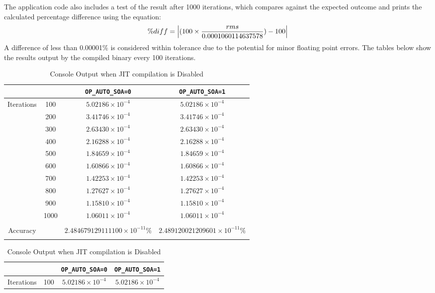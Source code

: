\noindent The application code also includes a test of the result after 1000 iterations, which compares against the expected outcome and prints the calculated percentage difference using the equation:
\[\%diff = \abs{ (100 \times \frac{rms}{0.0001060114637578}) - 100 }\]
A difference of less than 0.00001\% is considered within tolerance due to the potential for minor floating point errors.
\clearpage
{}
The tables below show the results output by the compiled binary every 100 iterations.
\begin{table}[H]
\renewcommand{\arraystretch}{1.2}
\caption{Console Output when JIT compilation is Enabled}
\label{tab:output}
\begin{tabular}{c c || c | c }
&  & \verb|OP_AUTO_SOA=0| & \verb|OP_AUTO_SOA=1| \\
\hline
\multirow{10}{*}{Iterations} & 100  & $ 5.02186\times10^{-4} $ & $ 5.02186\times10^{-4} $  \\
& 200  & $ 3.41746\times10^{-4} $ & $ 3.41746\times10^{-4} $  \\
& 300  & $ 2.63430\times10^{-4} $ & $ 2.63430\times10^{-4} $  \\
& 400  & $ 2.16288\times10^{-4} $ & $ 2.16288\times10^{-4} $  \\
& 500  & $ 1.84659\times10^{-4} $ & $ 1.84659\times10^{-4} $  \\
& 600  & $ 1.60866\times10^{-4} $ & $ 1.60866\times10^{-4} $  \\
& 700  & $ 1.42253\times10^{-4} $ & $ 1.42253\times10^{-4} $  \\
& 800  & $ 1.27627\times10^{-4} $ & $ 1.27627\times10^{-4} $  \\
& 900  & $ 1.15810\times10^{-4} $ & $ 1.15810\times10^{-4} $  \\
& 1000  & $ 1.06011\times10^{-4} $ & $ 1.06011\times10^{-4} $  \\
\hline
&&&\\
Accuracy & & $2.484679129111100\times10^{-11} \%$ & $2.489120021209601\times10^{-11} \%$ \\
&&&\\
\hline
\end{tabular}
\newline
\newline
\caption{Console Output when JIT compilation is Disabled}
\label{tab:output}
\begin{tabular}{c c || c | c }
&  & \verb|OP_AUTO_SOA=0| & \verb|OP_AUTO_SOA=1| \\
\hline
\multirow{10}{*}{Iterations} & 100  & $ 5.02186\times10^{-4} $ & $ 5.02186\times10^{-4} $  \\

\end{tabular}
\end{table}
